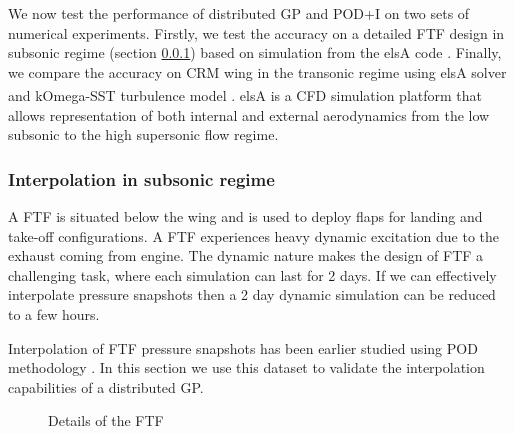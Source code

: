 We now test the performance of distributed GP and POD+I on two sets of numerical experiments. Firstly, we test the accuracy on a detailed FTF design \cite{bosco2016nonlinear} in subsonic regime (section \ref{subSec:elsAResults}) based on simulation from the elsA code \cite{cambier2008status}. Finally, we compare the accuracy on CRM wing in the transonic regime using elsA solver and kOmega-SST turbulence model \cite{vassberg2014summary}. elsA\textsuperscript{\textregistered} \cite{cambier2008status} is a CFD simulation platform that allows representation of both internal and external aerodynamics from the low subsonic to the high supersonic flow regime.  

\subsubsection{Interpolation in subsonic regime}\label{subSec:elsAResults}
A FTF is situated below the wing and is used to deploy flaps for landing and take-off configurations. A FTF experiences heavy dynamic excitation due to the exhaust coming from engine. The dynamic nature makes the design of FTF a challenging task, where each simulation can last for 2 days. If we can effectively interpolate pressure snapshots then a 2 day dynamic simulation can be reduced to a few hours. 

Interpolation of FTF pressure snapshots has been earlier studied using POD methodology \cite{bosco2016nonlinear}. In this section we use this dataset to validate the interpolation capabilities of a distributed GP. 


\begin{figure}[!ht]
  \centering
  \quad
  \quad
      \caption{Details of the FTF}
\end{figure}


